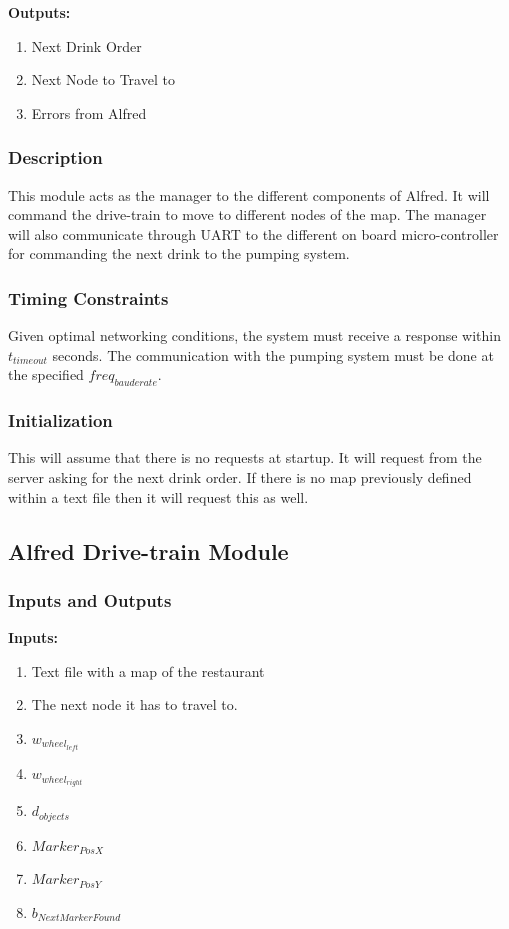 \documentclass [10pt]{article}
\begin{document}
\textbf{Outputs: } 
\begin{enumerate}
	\item Next Drink Order
	\item Next Node to Travel to
	\item Errors from Alfred
\end{enumerate}

\subsubsection{Description}
This module acts as the manager to the different components of Alfred. It will command the drive-train to move to different nodes of the map. The manager will also communicate through UART to the different on board micro-controller for commanding the next drink to the pumping system.
\subsubsection{Timing Constraints}
Given optimal networking conditions, the system must receive a response within  $ t_{timeout} $ seconds. The communication with the pumping system must be done at the specified $freq_{bauderate}$.

\subsubsection{Initialization}
This will assume that there is no requests at startup. It will request from the server asking for the next drink order. If there is no map previously defined within a text file then it will request this as well.

\subsection{Alfred Drive-train Module}

\subsubsection{Inputs and Outputs}

\textbf{Inputs: } 
\begin{enumerate}
	\item Text file with a map of the restaurant
	\item The next node it has to travel to.
	\item $ w_{wheel_{left}} $
	\item $ w_{wheel_{right}} $
	\item $ d_{objects} $ 
	\item $ Marker_{PosX} $
	\item $ Marker_{PosY} $
	\item $ b_{NextMarkerFound} $
\end{enumerate}
\end{document}
